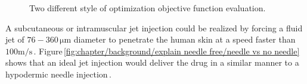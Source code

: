         \begin{figure}[!ht]
            \centering
            \qquad
            \caption{
                Two different style of optimization objective function evaluation.
            }   \label{fig:chapter/background/explain needle free}
        \end{figure}
        
        A subcutaneous or intramuscular jet injection could be realized by forcing a fluid jet of $\mathrm{76-360\,\mu m}$  diameter to penetrate the human skin at a speed faster than $\mathrm{100 m/s}$\,\cite{mitragotri2006,Hogan2006}. Figure\,\ref{fig:chapter/background/explain needle free/needle vs no needle} shows that an ideal jet injection would deliver the drug in a similar manner to a hypodermic needle injection\,\cite{InsuJet2013}.
        
        
